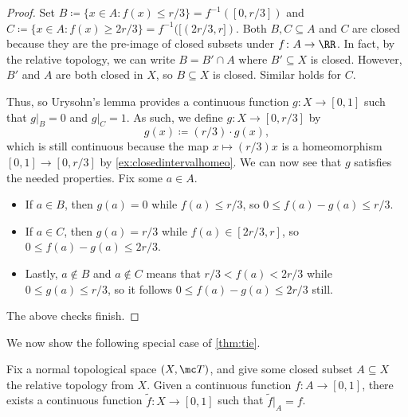 \documentclass[../notes.tex]{subfiles}
\begin{document}
\begin{proof}
	Set $B \coloneqq\{x\in A:f(x)\le r/3\}=f^{-1}([0,r/3])$ and $C \coloneqq\{x\in A:f(x)\ge 2r/3\}=f^{-1}([(2r/3,r])$. Both $B,C\subseteq A$ and $C$ are closed because they are the pre-image of closed subsets under $f\colon A\to\RR$. In fact, by the relative topology, we can write $B=B'\cap A$ where $B'\subseteq X$ is closed. However, $B'$ and $A$ are both closed in $X$, so $B\subseteq X$ is closed. Similar holds for $C$.
	
	Thus, so Urysohn's lemma provides a continuous function $g\colon X\to[0,1]$ such that $g|_B=0$ and $g|_C=1$. As such, we define $g\colon X\to[0,r/3]$ by
	\[g(x)\coloneqq(r/3)\cdot g(x),\]
	which is still continuous because the map $x\mapsto(r/3)x$ is a homeomorphism $[0,1]\to[0,r/3]$ by \autoref{ex:closedintervalhomeo}. We can now see that $g$ satisfies the needed properties. Fix some $a\in A$.
	\begin{itemize}
		\item If $a\in B$, then $g(a)=0$ while $f(a)\le r/3$, so $0\le f(a)-g(a)\le r/3$.
		\item If $a\in C$, then $g(a)=r/3$ while $f(a)\in[2r/3,r]$, so $0\le f(a)-g(a)\le 2r/3$.
		\item Lastly, $a\notin B$ and $a\notin C$ means that $r/3<f(a)<2r/3$ while $0\le g(a)\le r/3$, so it follows $0\le f(a)-g(a)\le 2r/3$ still.
	\end{itemize}
	The above checks finish.
\end{proof}
We now show the following special case of \autoref{thm:tie}.
\begin{prop}
	Fix a normal topological space $(X,\mc T)$, and give some closed subset $A\subseteq X$ the relative topology from $X$. Given a continuous function $f\colon A\to[0,1]$, there exists a continuous function $\widetilde f\colon X\to[0,1]$ such that $\widetilde f|_A=f$.
\end{prop}
\end{document}
